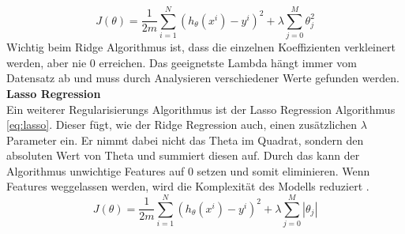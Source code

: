 %
\begin{equation}
\label{eq:ridge}
J(\theta) = \frac{1}{2m} \sum_{i=1}^{N} (h_\theta(x^i) - y^i)^2 + \lambda \sum_{j=0}^{M} \theta_{j}^{2}
\end{equation}
%
\newline
Wichtig beim Ridge Algorithmus ist, dass die einzelnen Koeffizienten verkleinert werden, aber nie 0 erreichen. Das geeignetste Lambda hängt immer vom Datensatz ab und muss durch Analysieren verschiedener Werte gefunden werden.\\[2ex]
%
\textbf{Lasso Regression}\\
Ein weiterer Regularisierungs Algorithmus ist der Lasso Regression Algorithmus \eqref{eq:lasso}. Dieser fügt, wie der Ridge Regression auch, einen zusätzlichen $\lambda$ Parameter ein. Er nimmt dabei nicht das Theta im Quadrat, sondern den absoluten Wert von Theta und summiert diesen auf. Durch das kann der Algorithmus unwichtige Features auf 0 setzen und somit eliminieren. Wenn Features weggelassen werden, wird die Komplexität des Modells reduziert \cite{lasso}.
%
\begin{equation}
\label{eq:lasso}
J(\theta) = \frac{1}{2m} \sum_{i=1}^{N} (h_\theta(x^i) - y^i)^2 + \lambda \sum_{j=0}^{M} |\theta_j|
\end{equation}
%
%
